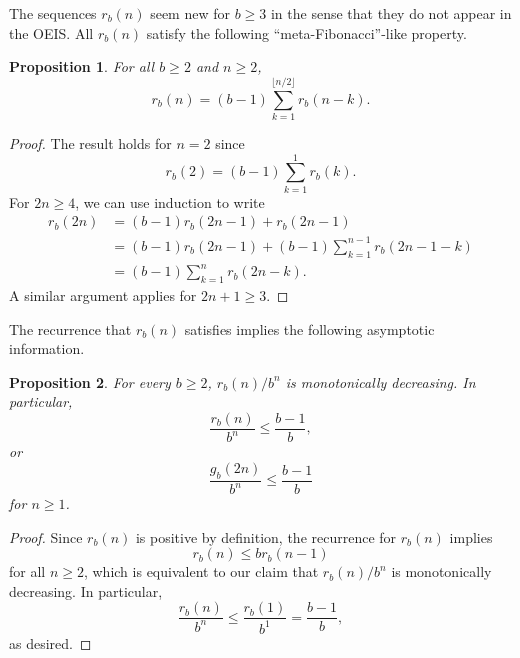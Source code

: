 \documentclass[12pt]{amsart}
\newtheorem{proposition}{Proposition}
\theoremstyle{definition}
\begin{document}
The sequences $r_b(n)$ seem new for $b \geq 3$ in the sense that they do not
appear in the OEIS. All $r_b(n)$ satisfy the following ``meta-Fibonacci''-like
property.

\begin{proposition}
    For all $b \geq 2$ and $n \geq 2$,
    \begin{equation*}
        r_b(n) = (b - 1) \sum_{k = 1}^{\lfloor n / 2 \rfloor} r_b(n - k).
    \end{equation*}
\end{proposition}

\begin{proof}
    The result holds for $n = 2$ since
    \begin{equation*}
        r_b(2) = (b - 1) \sum_{k = 1}^1 r_b(k).
    \end{equation*}
    For $2n \geq 4$, we can use induction to write
    \begin{align*}
        r_b(2n) &= (b - 1) r_b(2n - 1) + r_b(2n - 1) \\
                &= (b - 1) r_b(2n - 1) + (b - 1) \sum_{k = 1}^{n - 1} r_b(2n - 1 - k) \\
                &= (b - 1) \sum_{k = 1}^n r_b(2n - k).
    \end{align*}
    A similar argument applies for $2n + 1 \geq 3$.
\end{proof}

The recurrence that $r_b(n)$ satisfies implies the following asymptotic information.

\begin{proposition}
    \label{monotone}
    For every $b \geq 2$, $r_b(n) / b^n$ is monotonically decreasing. In
    particular,
    \begin{equation*}
        \frac{r_b(n)}{b^n} \leq \frac{b - 1}{b},
    \end{equation*}
    or
    \begin{equation*}
        \frac{g_b(2n)}{b^n} \leq \frac{b - 1}{b}
    \end{equation*}
    for $n \geq 1$.
\end{proposition}

\begin{proof}
    Since $r_b(n)$ is positive by definition, the recurrence for $r_b(n)$
    implies
    \begin{equation*}
        r_b(n) \leq b r_b(n - 1)
    \end{equation*}
    for all $n \geq 2$, which is equivalent to our claim that $r_b(n) / b^n$
    is monotonically decreasing. In particular,
    \begin{equation*}
        \frac{r_b(n)}{b^n} \leq \frac{r_b(1)}{b^1} = \frac{b - 1}{b},
    \end{equation*}
    as desired.
\end{proof}
\end{document}
